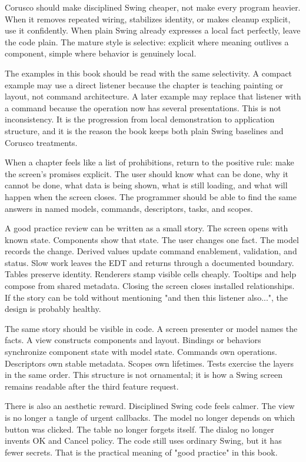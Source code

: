 Corusco should make disciplined Swing cheaper, not make every program heavier.
When it removes repeated wiring, stabilizes identity, or makes cleanup explicit,
use it confidently. When plain Swing already expresses a local fact perfectly,
leave the code plain. The mature style is selective: explicit where meaning
outlives a component, simple where behavior is genuinely local.

The examples in this book should be read with the same selectivity. A compact
example may use a direct listener because the chapter is teaching painting or
layout, not command architecture. A later example may replace that listener
with a command because the operation now has several presentations. This is not
inconsistency. It is the progression from local demonstration to application
structure, and it is the reason the book keeps both plain Swing baselines and
Corusco treatments.

When a chapter feels like a list of prohibitions, return to the positive rule:
make the screen's promises explicit. The user should know what can be done, why
it cannot be done, what data is being shown, what is still loading, and what
will happen when the screen closes. The programmer should be able to find the
same answers in named models, commands, descriptors, tasks, and scopes.

A good practice review can be written as a small story. The screen opens with
known state. Components show that state. The user changes one fact. The model
records the change. Derived values update command enablement, validation, and
status. Slow work leaves the EDT and returns through a documented boundary.
Tables preserve identity. Renderers stamp visible cells cheaply. Tooltips and
help compose from shared metadata. Closing the screen closes installed
relationships. If the story can be told without mentioning "and then this
listener also...", the design is probably healthy.

The same story should be visible in code. A screen presenter or model names the facts.
A view constructs components and layout. Bindings or behaviors synchronize
component state with model state. Commands own operations. Descriptors own
stable metadata. Scopes own lifetimes. Tests exercise the layers in the same
order. This structure is not ornamental; it is how a Swing screen remains
readable after the third feature request.

There is also an aesthetic reward. Disciplined Swing code feels calmer. The
view is no longer a tangle of urgent callbacks. The model no longer depends on
which button was clicked. The table no longer forgets itself. The dialog no
longer invents OK and Cancel policy. The code still uses ordinary Swing, but it
has fewer secrets. That is the practical meaning of "good practice" in this
book.

